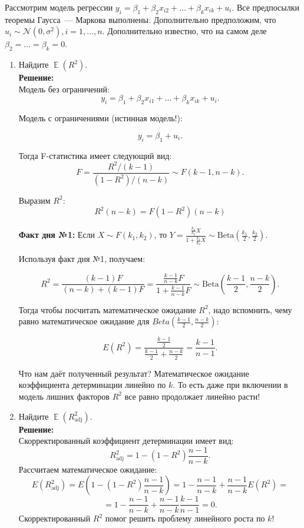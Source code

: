 \documentclass[12pt]{article}
\DeclareMathOperator{\E}{\mathbb{E}}
\newcommand{\cN}{\mathcal{N}}
\newcommand{\dBeta}{\mathrm{Beta}}
\newcommand{\adj}{\text{adj}}
\begin{document}
\begin{problem}
Рассмотрим модель регрессии $y_i = \beta_1 + \beta_2x_{i2} + \dots +\beta_kx_{ik} + u_i$. 
Все предпосылки теоремы Гаусса~— Маркова выполнены. 
Дополнительно предположим, что $u_i \sim \cN(0,\sigma^2), i=1, \dots, n$. 
Дополнительно известно, что на самом деле $\beta_2 = \dots = \beta_k = 0$.
\begin{enumerate}
\item Найдите $\E(R^2)$.\\

\textbf{Решение:}\\
Модель без ограничений: 
\[
y_i = \beta_1 + \beta_2x_{i1} + \dots +\beta_kx_{ik} + u_i.
\]

Модель с ограничениями (истинная модель!):

\[
y_i = \beta_1 + u_i.
\]

Тогда F-статистика имеет следующий вид:
\[
F = \frac{R^2/(k-1)}{(1-R^2)/(n-k)} \sim F(k-1,n-k).
\]

Выразим $R^2$:
\[
R^2(n-k) = F(1-R^2)(n-k)
\]

\textbf{Факт дня №1:} Если $X \sim F(k_1, k_2)$, то $Y = \frac{\frac{k_1}{k_2}X}{1+\frac{k_1}{k_2}X} \sim \dBeta \left(\frac{k_1}{2}, \frac{k_2}{2}\right)$.

Используя факт дня №1, получаем:

\[
R^2 = \frac{(k-1)F}{(n-k) + (k-1)F} = \frac{\frac{k-1}{n-k}F}{1+\frac{k-1}{n-k}F} \sim \dBeta\left(\frac{k-1}{2},\frac{n-k}{2}\right).
\]

Тогда чтобы посчитать математическое ожидание $R^2$, надо вспомнить, чему равно математическое ожидание для $Beta\left(\frac{k-1}{2},\frac{n-k}{2}\right)$:

\[
E(R^2) = \frac{\frac{k-1}{2}}{\frac{k-1}{2}+\frac{n-k}{2}} = \frac{k-1}{n-1}.
\]

Что нам даёт полученный результат? Математическое ожидание коэффициента детерминации линейно по $k$. То есть даже при включении в модель лишних факторов $R^2$ все равно продолжает линейно расти!
\item Найдите $\E(R^2_{\adj})$.\\
\textbf{Решение:}\\
Скорректированный коэффициент детерминации имеет вид:
\[
R^2_{\adj} = 1 - \left(1 - R^2\right)\frac{n-1}{n-k}.
\]
Рассчитаем математическое ожидание:
\[
E(R^2_{\adj}) = E\left(1 - \left(1 - R^2\right)\frac{n-1}{n-k}\right) = 1-\frac{n-1}{n-k}+\frac{n-1}{n-k}E(R^2) = 
\]
\[
= 1-\frac{n-1}{n-k}+\frac{n-1}{n-k}\frac{k-1}{n-1} = 0.
\]
Скорректированный $R^2$ помог решить проблему линейного роста по $k$!
\end{enumerate}
\end{problem}
\end{document}
